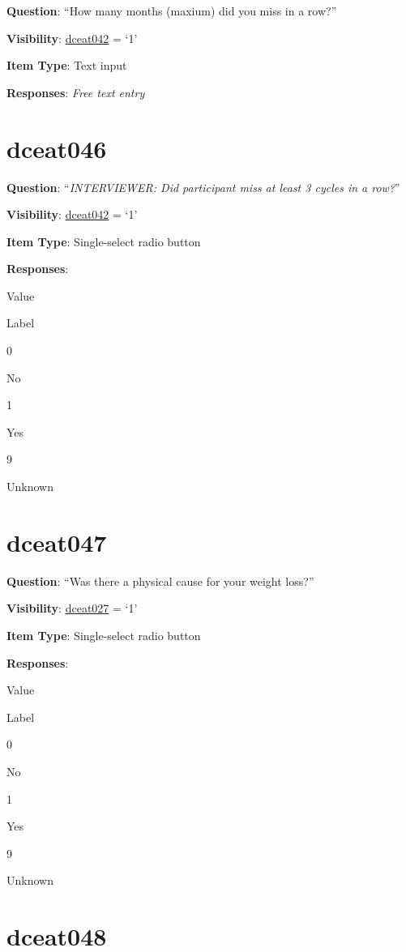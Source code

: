 \documentclass[]{book}
\begin{document}
\textbf{Question}: ``How many months (maxium) did you miss in a row?''

\textbf{Visibility}: \protect\hyperlink{dceat042}{dceat042} = `1'

\textbf{Item Type}: Text input

\textbf{Responses}: \emph{Free text entry}

\hypertarget{dceat046}{%
\section{dceat046}\label{dceat046}}

\textbf{Question}: ``\emph{INTERVIEWER: Did participant miss at least 3 cycles in a row?}''

\textbf{Visibility}: \protect\hyperlink{dceat042}{dceat042} = `1'

\textbf{Item Type}: Single-select radio button

\textbf{Responses}:

Value

Label

0

No

1

Yes

9

Unknown

\hypertarget{dceat047}{%
\section{dceat047}\label{dceat047}}

\textbf{Question}: ``Was there a physical cause for your weight loss?''

\textbf{Visibility}: \protect\hyperlink{dceat027}{dceat027} = `1'

\textbf{Item Type}: Single-select radio button

\textbf{Responses}:

Value

Label

0

No

1

Yes

9

Unknown

\hypertarget{dceat048}{%
\section{dceat048}\label{dceat048}}
\end{document}
